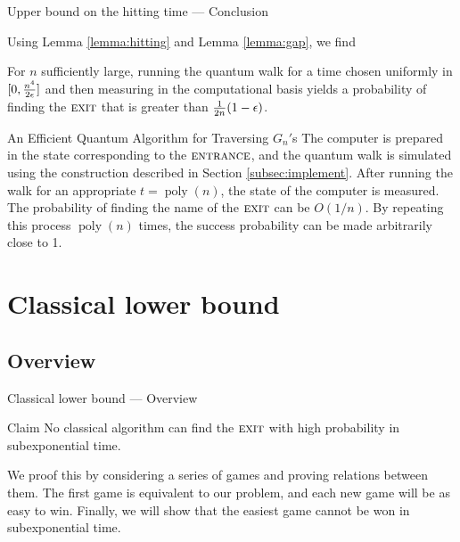 \documentclass{beamer}
\newcommand{\<}{\langle}
\renewcommand{\>}{\rangle}
\newcommand{\ent}{{\textsc{entrance}}}
\newcommand{\exit}{{\textsc{exit}}}
\newcommand{\poly}{\mathop{\mathrm{poly}}\nolimits}
\begin{document}
\begin{frame}{Upper bound on the hitting time --- Conclusion}

Using Lemma \ref{lemma:hitting} and Lemma \ref{lemma:gap}, we find
%
\begin{theorem}
For $n$ sufficiently large, running the quantum walk for a time chosen
uniformly in $[0,{n^4 \over 2\epsilon}]$ and then measuring in the
computational basis yields a probability of finding the $\exit$ that is
greater than ${1 \over 2n} (1-\epsilon)$.
\label{thm:hitting}
\end{theorem}

\begin{block}{An Efficient Quantum Algorithm for Traversing $G_n'$s}
The computer is prepared in the state corresponding to the $\ent$, and the quantum walk is simulated using the construction described in Section \ref{subsec:implement}.  After
running the walk for an appropriate $t=\poly(n)$, the state of the computer is
measured. The probability of finding the name of the $\exit$ can be $O(1/n)$.  By
repeating this process $\poly(n)$ times, the success probability can be
made arbitrarily close to 1. 
\end{block}

\end{frame}



\section{Classical lower bound}\label{sec:lowerbound}

\subsection{Overview}\label{classical:overview}

\begin{frame}{Classical lower bound --- Overview}

\begin{block}{{Claim}}
No classical algorithm can find the $\exit$ with high
probability in subexponential time.
\end{block}
We proof this by considering a series of games and proving relations between them. The first game is equivalent to our problem, and each new game will be as easy to win.
Finally, we will show that the easiest game cannot be won in subexponential time.
\end{frame}
\end{document}
